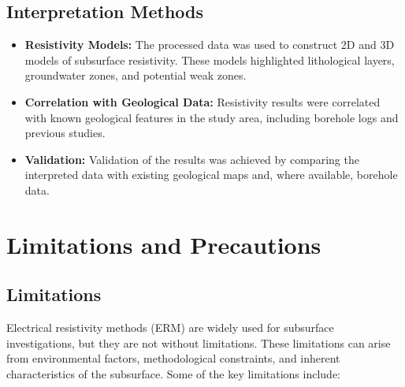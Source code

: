 \documentclass[12pt,a4paper]{report}
\begin{document}
\subsection{Interpretation Methods}
\begin{itemize}
    \item \textbf{Resistivity Models:} The processed data was used to construct 2D and 3D models of subsurface resistivity. These models highlighted lithological layers, groundwater zones, and potential weak zones.
    \item \textbf{Correlation with Geological Data:} Resistivity results were correlated with known geological features in the study area, including borehole logs and previous studies.
    \item \textbf{Validation:} Validation of the results was achieved by comparing the interpreted data with existing geological maps and, where available, borehole data.
\end{itemize}

\section{Limitations and Precautions}

\subsection{Limitations}
Electrical resistivity methods (ERM) are widely used for subsurface investigations, but they are not without limitations. These limitations can arise from environmental factors, methodological constraints, and inherent characteristics of the subsurface. Some of the key limitations include:
\end{document}
